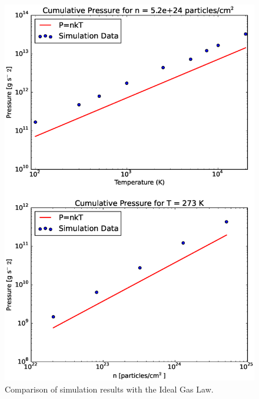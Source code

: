 \documentclass[12pt]{amsart}
\begin{document}
\begin{figure}[h!]
  \centering
    \includegraphics[width=1.0\textwidth]{pv_nrt.eps}
    \caption{Comparison of simulation results with the Ideal Gas Law.}
\end{figure}
\end{document}
